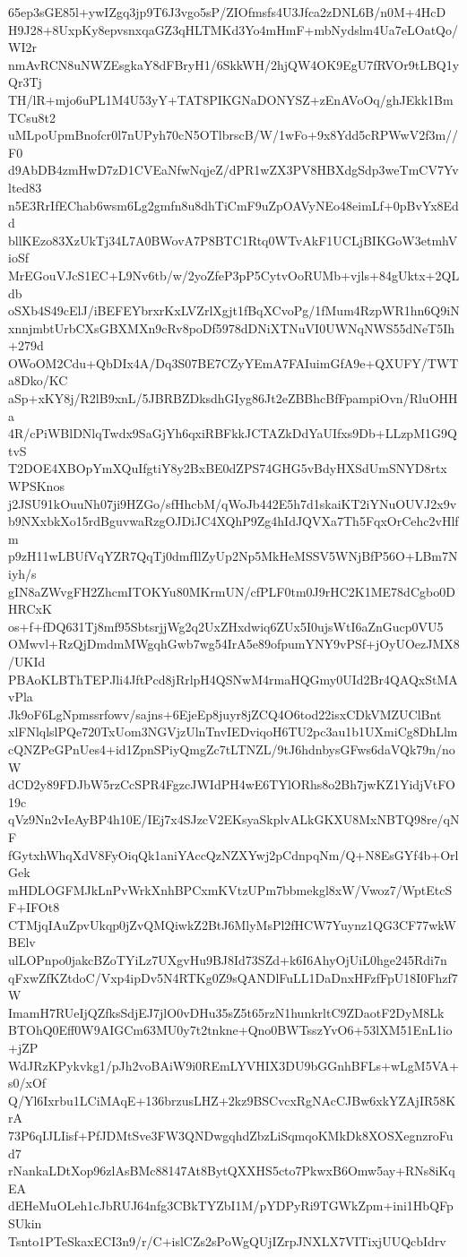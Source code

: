 65ep3sGE85l+ywIZgq3jp9T6J3vgo5sP/ZIOfmsfs4U3Jfca2zDNL6B/n0M+4HcD
H9J28+8UxpKy8epvsnxqaGZ3qHLTMKd3Yo4mHmF+mbNydslm4Ua7eLOatQo/WI2r
nmAvRCN8uNWZEsgkaY8dFBryH1/6SkkWH/2hjQW4OK9EgU7fRVOr9tLBQ1yQr3Tj
TH/lR+mjo6uPL1M4U53yY+TAT8PIKGNaDONYSZ+zEnAVoOq/ghJEkk1BmTCsu8t2
uMLpoUpmBnofcr0l7nUPyh70cN5OTlbrscB/W/1wFo+9x8Ydd5cRPWwV2f3m//F0
d9AbDB4zmHwD7zD1CVEaNfwNqjeZ/dPR1wZX3PV8HBXdgSdp3weTmCV7Yvlted83
n5E3RrIfEChab6wsm6Lg2gmfn8u8dhTiCmF9uZpOAVyNEo48eimLf+0pBvYx8Edd
bllKEzo83XzUkTj34L7A0BWovA7P8BTC1Rtq0WTvAkF1UCLjBIKGoW3etmhVioSf
MrEGouVJcS1EC+L9Nv6tb/w/2yoZfeP3pP5CytvOoRUMb+vjls+84gUktx+2QLdb
oSXb4S49cElJ/iBEFEYbrxrKxLVZrlXgjt1fBqXCvoPg/1fMum4RzpWR1hn6Q9iN
xnnjmbtUrbCXsGBXMXn9cRv8poDf5978dDNiXTNuVI0UWNqNWS55dNeT5Ih+279d
OWoOM2Cdu+QbDIx4A/Dq3S07BE7CZyYEmA7FAIuimGfA9e+QXUFY/TWTa8Dko/KC
aSp+xKY8j/R2lB9xnL/5JBRBZDksdhGIyg86Jt2eZBBhcBfFpampiOvn/RluOHHa
4R/cPiWBlDNlqTwdx9SaGjYh6qxiRBFkkJCTAZkDdYaUIfxs9Db+LLzpM1G9QtvS
T2DOE4XBOpYmXQuIfgtiY8y2BxBE0dZPS74GHG5vBdyHXSdUmSNYD8rtxWPSKnos
j2JSU91kOuuNh07ji9HZGo/sfHhcbM/qWoJb442E5h7d1skaiKT2iYNuOUVJ2x9v
b9NXxbkXo15rdBguvwaRzgOJDiJC4XQhP9Zg4hIdJQVXa7Th5FqxOrCehc2vHlfm
p9zH11wLBUfVqYZR7QqTj0dmfIlZyUp2Np5MkHeMSSV5WNjBfP56O+LBm7Niyh/s
gIN8aZWvgFH2ZhcmITOKYu80MKrmUN/cfPLF0tm0J9rHC2K1ME78dCgbo0DHRCxK
os+f+fDQ631Tj8mf95SbtsrjjWg2q2UxZHxdwiq6ZUx5I0ujsWtI6aZnGucp0VU5
OMwvl+RzQjDmdmMWgqhGwb7wg54IrA5e89ofpumYNY9vPSf+jOyUOezJMX8/UKId
PBAoKLBThTEPJli4JftPcd8jRrlpH4QSNwM4rmaHQGmy0UId2Br4QAQxStMAvPla
Jk9oF6LgNpmssrfowv/sajns+6EjeEp8juyr8jZCQ4O6tod22isxCDkVMZUClBnt
xlFNlqlslPQe720TxUom3NGVjzUlnTnvIEDviqoH6TU2pc3au1b1UXmiCg8DhLlm
cQNZPeGPnUes4+id1ZpnSPiyQmgZc7tLTNZL/9tJ6hdnbysGFws6daVQk79n/noW
dCD2y89FDJbW5rzCcSPR4FgzcJWIdPH4wE6TYlORhs8o2Bh7jwKZ1YidjVtFO19c
qVz9Nn2vIeAyBP4h10E/IEj7x4SJzcV2EKsyaSkplvALkGKXU8MxNBTQ98re/qNF
fGytxhWhqXdV8FyOiqQk1aniYAccQzNZXYwj2pCdnpqNm/Q+N8EsGYf4b+OrlGek
mHDLOGFMJkLnPvWrkXnhBPCxmKVtzUPm7bbmekgl8xW/Vwoz7/WptEtcSF+IFOt8
CTMjqIAuZpvUkqp0jZvQMQiwkZ2BtJ6MlyMsPl2fHCW7Yuynz1QG3CF77wkWBElv
ulLOPnpo0jakcBZoTYiLz7UXgvHu9BJ8Id73SZd+k6I6AhyOjUiL0hge245Rdi7n
qFxwZfKZtdoC/Vxp4ipDv5N4RTKg0Z9sQANDlFuLL1DaDnxHFzfFpU18I0Fhzf7W
ImamH7RUeIjQZfksSdjEJ7jlO0vDHu35sZ5t65rzN1hunkrltC9ZDaotF2DyM8Lk
BTOhQ0Eff0W9AIGCm63MU0y7t2tnkne+Qno0BWTsszYvO6+53lXM51EnL1io+jZP
WdJRzKPykvkg1/pJh2voBAiW9i0REmLYVHIX3DU9bGGnhBFLs+wLgM5VA+s0/xOf
Q/Yl6Ixrbu1LCiMAqE+136brzusLHZ+2kz9BSCvcxRgNAcCJBw6xkYZAjIR58KrA
73P6qIJLIisf+PfJDMtSve3FW3QNDwgqhdZbzLiSqmqoKMkDk8XOSXegnzroFud7
rNankaLDtXop96zlAsBMc88147At8BytQXXHS5cto7PkwxB6Omw5ay+RNs8iKqEA
dEHeMuOLeh1cJbRUJ64nfg3CBkTYZbI1M/pYDPyRi9TGWkZpm+ini1HbQFpSUkin
Tsnto1PTeSkaxECI3n9/r/C+islCZs2sPoWgQUjIZrpJNXLX7VITixjUUQcbIdrv
